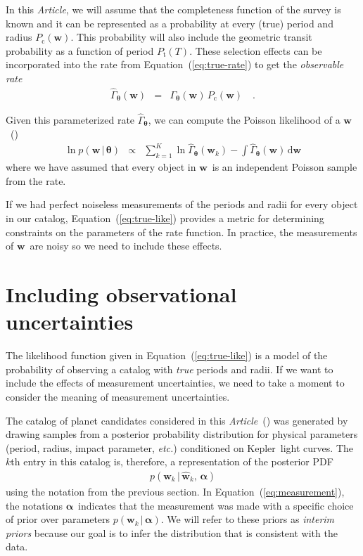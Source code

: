 \documentclass[12pt,preprint]{aastex}
\newcommand{\project}[1]{{\sffamily #1}}
\newcommand{\kepler}{\project{Kepler}}
\newcommand{\paper}{\emph{Article}}
\newcommand{\foreign}[1]{\emph{#1}}
\newcommand{\etc}{\foreign{etc.}}
\newcommand{\Eq}[1]{Equation~(\ref{eq:#1})}
\newcommand{\eq}[1]{\Eq{#1}}
\newcommand{\eqlabel}[1]{\label{eq:#1}}
\newcommand{\dd}{\ensuremath{\,\mathrm{d}}}
\newcommand{\bvec}[1]{\ensuremath{\boldsymbol{#1}}}
\newcommand{\rate}{\ensuremath{\Gamma}}
\newcommand{\ratepar}{{\ensuremath{\theta}}}
\newcommand{\ratepars}{{\ensuremath{\bvec{\ratepar}}}}
\newcommand{\obs}[1]{\ensuremath{\hat{#1}}}
\newcommand{\period}{\ensuremath{T}}
\newcommand{\completeness}{{\ensuremath{P_\mathrm{c}}}}
\newcommand{\transitprob}{{\ensuremath{P_\mathrm{t}}}}
\newcommand{\entry}{{\ensuremath{\bvec{w}}}}
\newcommand{\catalog}{{\ensuremath{\bvec{\entry}}}}
\newcommand{\interim}{{\ensuremath{\bvec{\alpha}}}}
\begin{document}
In this \paper, we will assume that the completeness function of the survey is
known and it can be represented as a probability at every (true) period and
radius $\completeness (\entry)$.
This probability will also include the geometric transit probability as a
function of period $\transitprob (\period)$.
These selection effects can be incorporated into the rate from \eq{true-rate}
to get the \emph{observable rate}
\begin{eqnarray}\eqlabel{obs-rate}
\obs{\rate}_\ratepars (\entry)
&=& \rate_\ratepars(\entry)\,\completeness(\entry)\quad.
\end{eqnarray}

Given this parameterized rate $\obs{\rate}_\ratepars$, we can compute the
Poisson likelihood of a \catalog\ (\citealt{tabachnik,youdin,dong})
\begin{eqnarray}\eqlabel{true-like}
\ln p(\catalog\,|\,\ratepars) &\propto&
\sum_{k=1}^K \ln\obs{\rate}_\ratepars (\entry_k)
- \int \obs{\rate}_\ratepars (\entry) \dd\entry
\end{eqnarray}
where we have assumed that every object in \catalog\ is an independent
Poisson sample from the rate.

If we had perfect noiseless measurements of the periods and radii for every
object in our catalog, \eq{true-like} provides a metric for determining
constraints on the parameters of the rate function.
In practice, the measurements of \catalog\ are noisy so we need to include
these effects.

\section{Including observational uncertainties}

The likelihood function given in \eq{true-like} is a model of the
probability of observing a catalog with \emph{true} periods and radii.
If we want to include the effects of measurement uncertainties, we need to
take a moment to consider the meaning of measurement uncertainties.

The catalog of planet candidates considered in this \paper\
(\citealt{petigura}) was generated by drawing samples from a posterior
probability distribution for physical parameters (period, radius, impact
parameter, \etc) conditioned on \kepler\ light curves.
The $k$th entry in this catalog is, therefore, a representation of the
posterior PDF
\begin{eqnarray}\eqlabel{measurement}
p(\entry_k\,|\,\obs{\entry}_k,\,\interim)
\end{eqnarray}
using the notation from the previous section.
In \eq{measurement}, the notations \interim\ indicates that the measurement
was made with a specific choice of prior over parameters
$p(\entry_k\,|\,\interim)$.
We will refer to these priors as \emph{interim priors} because our goal is to
infer the distribution that is consistent with the data.
\end{document}
